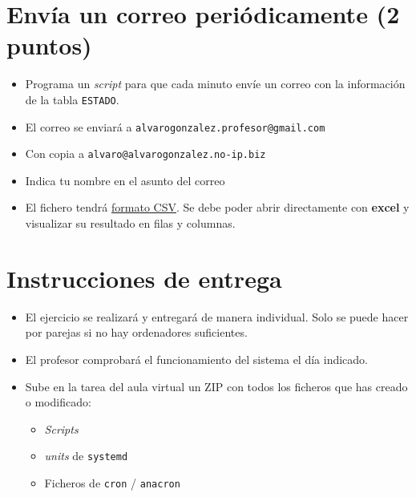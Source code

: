 \documentclass[a4paper]{article}
\begin{document}
\section{Envía un correo periódicamente (2 puntos)}
\label{sec:org000000f}
\begin{itemize}
\item Programa un \emph{script} para que cada minuto envíe un correo con la información de la tabla \texttt{ESTADO}.
\item El correo se enviará a \texttt{alvarogonzalez.profesor@gmail.com}
\item Con copia a \texttt{alvaro@alvarogonzalez.no-ip.biz}
\item Indica tu nombre en el asunto del correo
\item El fichero tendrá \href{https://stackoverflow.com/questions/643137/how-do-i-spool-to-a-csv-formatted-file-using-sqlplus\#654723}{formato CSV}. Se debe poder abrir directamente con \textbf{excel} y visualizar su resultado en filas y columnas.
\end{itemize}





\section{Instrucciones de entrega}
\label{sec:org0000012}

\begin{itemize}
\item El ejercicio se realizará y entregará de manera individual. Solo se puede hacer por parejas si no hay ordenadores suficientes.
\item El profesor comprobará el funcionamiento del sistema el día indicado.
\item Sube en la tarea del aula virtual un ZIP con todos los ficheros que has creado o modificado:
\begin{itemize}
\item \emph{Scripts}
\item \emph{units} de \texttt{systemd}
\item Ficheros de \texttt{cron} / \texttt{anacron}
\end{itemize}
\end{itemize}
\end{document}
